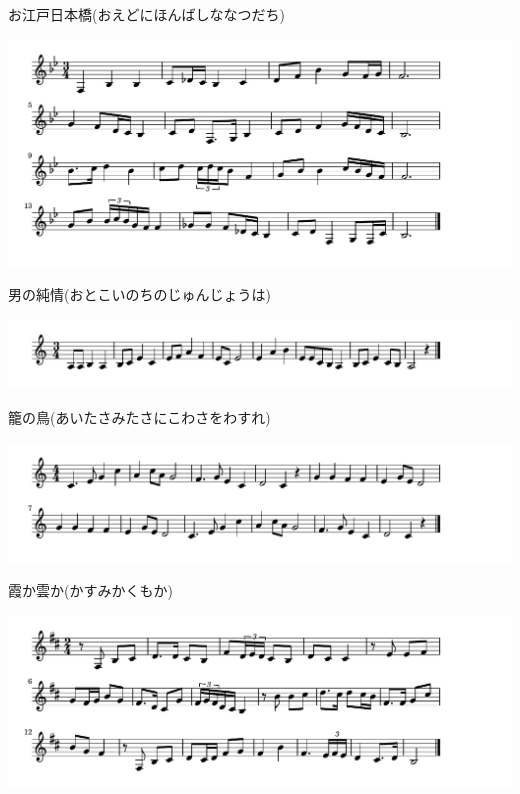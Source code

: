 \documentclass[a4paper]{ltjsarticle}
\begin{document}
\vspace{-10mm} \hspace{10mm}
お江戸日本橋(おえどにほんばしななつだち)

\includegraphics[clip]{otokonojunjo_crop.pdf}

\vspace{-10mm} \hspace{10mm}
男の純情(おとこいのちのじゅんじょうは)

\includegraphics[clip]{kagonotori_crop.pdf}

\vspace{-10mm} \hspace{10mm}
籠の鳥(あいたさみたさにこわさをわすれ)

\includegraphics[clip]{kasumikakumoka_crop.pdf}

\vspace{-10mm} \hspace{10mm}
霞か雲か(かすみかくもか)

\includegraphics[clip]{aoisebirode_crop.pdf}
\end{document}
